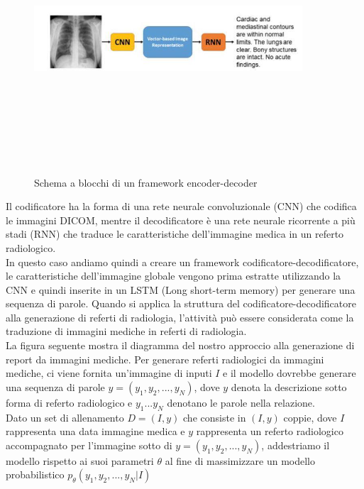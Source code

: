 \documentclass[12pt,a4paper]{report}
\begin{document}
\begin{figure}[h!]
    \begin{center}
        \includegraphics[width=10cm,height=10cm,keepaspectratio]{Encoder-Decoder}
    \end{center}
    \caption{Schema a blocchi di un framework encoder-decoder}
    \label{fig:econder-decoder}
\end{figure}



Il codificatore ha la forma di una rete neurale convoluzionale (CNN) che codifica le immagini DICOM, mentre il decodificatore è una rete neurale ricorrente a più stadi (RNN) che traduce le caratteristiche dell'immagine medica in un referto radiologico.\\
In questo caso andiamo quindi a creare un framework codificatore-decodificatore, le caratteristiche dell'immagine globale vengono prima estratte utilizzando la CNN e quindi inserite in un LSTM (Long short-term memory) per generare una sequenza di parole. Quando si applica la struttura del codificatore-decodificatore alla generazione di referti di radiologia, l'attività può essere considerata come la traduzione di immagini mediche in referti di radiologia.\\
La figura seguente mostra il diagramma del nostro approccio alla generazione di report da immagini mediche. Per generare referti radiologici da immagini mediche, ci viene fornita un'immagine di inputi $I$ e il modello dovrebbe generare una sequenza di parole $y = (y_1, y_2, . . . ,y_N)$, dove $y$ denota la descrizione sotto forma di referto radiologico e $y_1 . . .y_N$ denotano le parole nella relazione.\\
Dato un set di allenamento $D = (I, y)$ che consiste in $(I, y)$ coppie, dove $I$ rappresenta una data immagine medica e $y$ rappresenta un referto radiologico accompagnato per l'immagine sotto di $y = (y_1, y_2, . . . ,y_N)$, addestriamo il modello rispetto ai suoi parametri $\theta$ al fine di massimizzare un modello probabilistico $p_{\theta}(y_1, y_2, . . . , y_N|I)$
\end{document}
